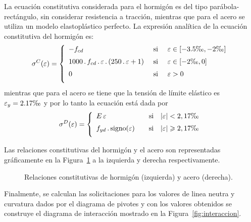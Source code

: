 La ecuación constitutiva considerada para el hormigón es del tipo parábola-rectángulo, sin considerar resistencia a tracción, mientras que para el acero se utiliza un modelo elastoplástico perfecto. %
%
La expresión analítica de la ecuación constitutiva del hormigón es:
%
\begin{equation}
\sigma^C(\varepsilon) = %
\left\{ %
\begin{array}{lcl}
-f_{cd}  & \text{ si } & \varepsilon  \in [ -3.5 \text{\permil} , -2\text{\permil} ]  \\[2mm]
1000  \,.\, f_{cd}  \,.\, \varepsilon  \,.\, ( 250 \,.\, \varepsilon + 1)  & \text{si} & \varepsilon \in [  -2 \text{\permil} , 0] \\[2mm]
0  & \text{ si } & \varepsilon  > 0 \\[2mm]
\end{array}   \right.
\end{equation}
%
mientras que para el acero se tiene que la tensión de límite elástico es $\varepsilon_y = 2.17 \text{\permil}$ y por lo tanto la ecuación está dada por
%
\begin{equation}
\sigma^D(\varepsilon) = %
\left\{ %
\begin{array}{lcl}
E \, \varepsilon  & \text{si} & |\varepsilon| < 2,17 \text{\permil} \\[2mm]
f_{yd} \,. \, \text{signo}(\varepsilon) \quad & \text{si} & |\varepsilon| \geq 2,17 \text{\permil} \\[2mm]
\end{array}   \right.
\end{equation}
%

Las relaciones constitutivas del hormigón y el acero son representadas gráficamente en la Figura~\ref{fig:graficos_consitutivas} a la izquierda y derecha respectivamente.
%
\begin{figure}[htb]
	\centering
\def\svgwidth{0.95\textwidth}

		\caption{Relaciones constitutivas de hormigón (izquierda) y acero (derecha).} \label{fig:graficos_consitutivas}
\end{figure}

Finalmente, se calculan las solicitaciones para los valores de linea neutra y curvatura dados por el diagrama de pivotes y con los valores obtenidos se construye el diagrama de interacción mostrado en la Figura~\ref{fig:interaccion}.

